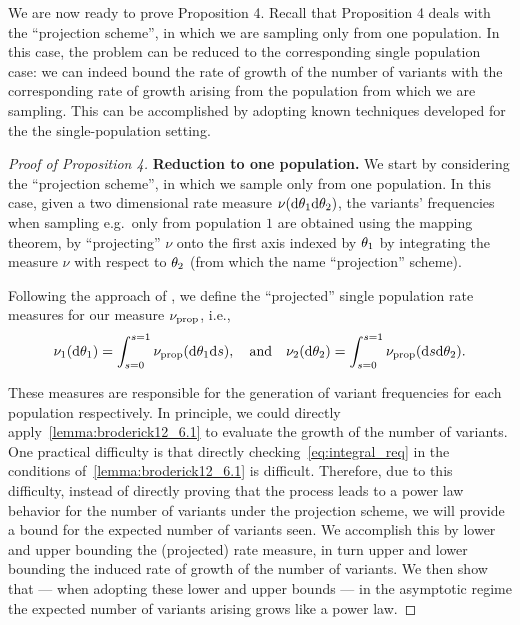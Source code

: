 We are now ready to prove Proposition 4.
Recall that  Proposition 4 deals with the ``projection scheme'', in which we are sampling only from one population. 
In this case, the problem can be reduced to the corresponding single population case: we can indeed bound the rate of growth of the number of variants with the corresponding rate of growth arising from the population from which we are sampling.
This can be accomplished by adopting known techniques developed for the the single-population setting.

\begin{proof}[Proof of Proposition 4]

\textbf{Reduction to one population.} We start by considering the ``projection scheme'', in which we sample only from one population. 
In this case, given a two dimensional rate measure $\nu(\mathrm{d} \theta_{1} \mathrm{d} \theta_{2})$, the variants' frequencies when sampling e.g.\ only from population $1$ are obtained using the mapping theorem, by ``projecting'' $\nu$ onto the first axis indexed by $\theta_{1}$ by integrating the measure $\nu$ with respect to $\theta_{2}$ (from which the name ``projection'' scheme). 


Following the approach of \citet{Broderick2012}, we define the ``projected'' single population rate measures for our measure $\nu_{\mathrm{prop}}$, i.e., 
\begin{equation}
    \nu_{1}(\mathrm{d} \theta_{1}) = \int_{s=0}^{s=1}\nu_{\mathrm{prop}}( \mathrm{d}\theta_{1}\mathrm{d} s),\quad\text{and}\quad
    \nu_{2}(\mathrm{d} \theta_{2}) = \int_{s=0}^{s=1}\nu_{\mathrm{prop}}( \mathrm{d} s \mathrm{d}\theta_{2}).
    \label{eq:singlepoprate}
\end{equation}

These measures are responsible for the generation of variant frequencies for each population respectively. 
In principle, we could directly apply~\cref{lemma:broderick12_6.1} to evaluate the growth of the number of variants.
One practical difficulty is that directly checking~\cref{eq:integral_req} in the conditions of~\cref{lemma:broderick12_6.1} is difficult.%
Therefore, due to this difficulty, instead of directly proving that the process leads to a power law behavior for the number of variants under the projection scheme, we will provide a bound for the expected number of variants seen.
We accomplish this by lower and upper bounding the (projected) rate measure, in turn upper and lower bounding the induced rate of growth of the number of variants. We then show that --- when adopting these lower and upper bounds --- in the asymptotic regime the expected number of variants arising grows like a power law. 





\end{proof}

